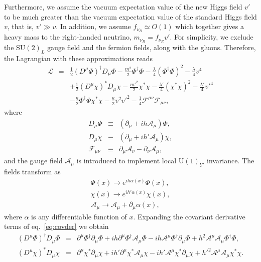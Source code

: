 Furthermore, we assume the vacuum expectation value of the new Higgs field $v'$ to be much greater than the vacuum expectation value of the standard Higgs field $v$, that is, $v'\gg v$. In addition, we assume  $f_{\nu_R}\simeq O(1)$ which together gives a heavy mass to the right-handed neutrino, $m_{\nu_R} = f_{\nu_R}v'$. For simplicity, we exclude the SU$(2)_L$ gauge field and the fermion fields, along with the gluons. Therefore, the Lagrangian with these approximations reads
\begin{eqnarray} 
	\mathcal{L} & = & \frac{1}{2}(D^{\mu}\Phi)^{\dagger}D_{\mu}\Phi - \frac{m^2}{2}\Phi^{\dagger}\Phi - \frac{\lambda}{4}(\Phi^{\dagger}\Phi)^2 -\frac{\lambda}{4}v^4   \nonumber\\
 & & +\frac{1}{2}(D^{\mu} \chi)^*D_{\mu} \chi - \frac{m'^2}{2}\chi^*\chi - \frac{\lambda'}{4}(\chi^* \chi)^2 -\frac{\lambda'}{4}v'^4\nonumber \\ 
 & & -\frac{\kappa}{2}\Phi^\dagger\Phi\chi^*\chi  -\frac{\kappa}{2}v^2v'^2 -\frac{1}{4}\mathcal{F}^{\mu\nu}\mathcal{F}_{\mu\nu}, %
\end{eqnarray}
where 
\begin{eqnarray}
D_{\mu} \Phi & \equiv & (\partial_{\mu} + ih\mathcal{A}_{\mu})\Phi,\nonumber \\ 
D_{\mu} \chi & \equiv & (\partial_{\mu} + ih'\mathcal{A}_{\mu})\chi,\nonumber \\
\mathcal{F}_{\mu\nu} & \equiv & \partial_{\mu}\mathcal{A}_{\nu}-\partial_{\nu}\mathcal{A}_{\mu},
\label{eq:covder}%
\end{eqnarray}
and the gauge field $\mathcal{A}_{\mu}$ is introduced to implement local U$(1)_{Y'}$ invariance. The fields transform as
\begin{eqnarray}
	\Phi(x) \to e^{ih\alpha(x)}\Phi(x), \nonumber \\
	\chi(x) \to e^{ih'\alpha(x)}\chi(x), \nonumber\\
	\mathcal{A}_{\mu} \to \mathcal{A}_{\mu} + \partial_{\mu} \alpha(x),
\end{eqnarray}
where $\alpha$ is any differentiable function of $x$.
Expanding the covariant derivative terms of eq.\ \eqref{eq:covder} we obtain
\begin{eqnarray*}
	(D^{\mu}\Phi)^{\dagger}D_{\mu}\Phi & = &  \partial^{\mu}\Phi^{\dagger}\partial_{\mu}\Phi + ih\partial^{\mu}\Phi^{\dagger}\mathcal{A}_{\mu} \Phi - ih\mathcal{A}^{\mu} \Phi^{\dagger}\partial_{\mu}\Phi +h^2\mathcal{A}^{\mu}\mathcal{A}_{\mu} \Phi^{\dagger}\Phi,\\
	 (D^{\mu}\chi)^{*}D_{\mu}\chi & = &  \partial^{\mu}\chi^{*}\partial_{\mu}\chi + ih'\partial^{\mu}\chi^{*}\mathcal{A}_{\mu} \chi - ih'\mathcal{A}^{\mu} \chi^{*}\partial_{\mu}\chi +h'^2\mathcal{A}^{\mu}\mathcal{A}_{\mu} \chi^{*}\chi.
\end{eqnarray*}
